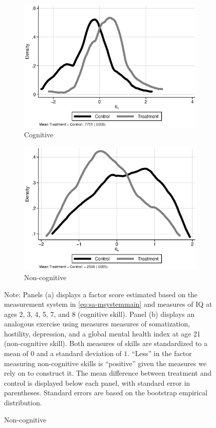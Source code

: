 \begin{figure}[!htbp]
\centering
\caption{Estimates of Cognitive ($\theta_{c}^d$) and Non-cognitive Skills ($\theta_{n}^d$)}\label{figure:factorsm}
\begin{subfigure}[h]{0.5\textwidth}
		\centering
		\caption{Cognitive} \label{fig:c}
		\includegraphics[width=\textwidth]{output/abccare_cfactor.eps}
\end{subfigure}%
\begin{subfigure}[h]{0.5\textwidth}
	\centering
	\caption{Non-cognitive} \label{fig:n}
		\includegraphics[width=\textwidth]{output/abccare_nfactor.eps}
\end{subfigure}
\footnotesize \justify
Note: Panels (a) displays a factor score estimated based on the measurement system in \eqref{eq:sa-msystemmain} and measures of IQ at ages 2, 3, 4, 5, 7, and 8 (cognitive skill). Panel (b) displays an analogous exercise using measures measures of somatization, hostility, depression, and a global mental health index at age 21 (non-cognitive skill). Both measures of skills are standardized to a mean of $0$ and a standard deviation of $1$. ``Less'' in the factor measuring non-cognitive skills is ``positive'' given the measures we rely on to construct it. The mean difference between treatment and control is displayed below each panel, with standard error in parentheses. Standard errors are based on the bootstrap empirical distribution.
\end{figure}


